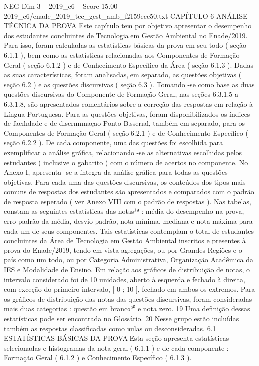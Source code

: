 \begin{textsample}{NEG Dim 3 – 2019\_c6 – Score 15.00 – 2019\_c6/enade\_2019\_tec\_gest\_amb\_f2159ecc50.txt}  \label{ex:f3_neg_266}
CAPÍTULO 6 ANÁLISE TÉCNICA DA PROVA Este capítulo tem por objetivo apresentar o desempenho dos estudantes concluintes de Tecnologia em Gestão Ambiental no Enade/2019.
Para isso, foram calculadas as estatísticas básicas da prova em seu todo ( seção 6.1.1 ), bem como as estatísticas relacionadas aos Componentes de Formação Geral ( seção 6.1.2 ) e de Conhecimento Específico da Área ( seção 6.1.3 ).
Dadas as suas características, foram analisadas, em separado, as questões objetivas ( seção 6.2 ) e as questões discursivas ( seção 6.3 ).
Tomando -se como base as duas questões discursivas do Componente de Formação Geral, nas seções 6.3.1.5 a 6.3.1.8, são apresentados comentários sobre a correção das respostas em relação à Língua Portuguesa.
Para as questões objetivas, foram disponibilizados os índices de facilidade e de discriminação Ponto-Bisserial, também em separado, para os Componentes de Formação Geral ( seção 6.2.1 ) e de Conhecimento Específico ( seção 6.2.2 ).
De cada componente, uma das questões foi escolhida para exemplificar a análise gráfica, relacionando -se as alternativas escolhidas pelos estudantes ( inclusive o gabarito ) com o número de acertos no componente.
No Anexo I, apresenta -se a íntegra da análise gráfica para todas as questões objetivas.
Para cada uma das questões discursivas, os conteúdos dos tipos mais comuns de respostas dos estudantes são apresentados e comparados com o padrão de resposta esperado ( ver Anexo VIII com o padrão de respostas ).
Nas tabelas, constam as seguintes estatísticas das notas¹⁹ : média do desempenho na prova, erro padrão da média, desvio padrão, nota mínima, mediana e nota máxima para cada um de seus componentes.
Tais estatísticas contemplam o total de estudantes concluintes da Área de Tecnologia em Gestão Ambiental inscritos e presentes à prova do Enade/2019, tendo em vista agregações, ou por Grandes Regiões e o país como um todo, ou por Categoria Administrativa, Organização Acadêmica da IES e Modalidade de Ensino.
Em relação aos gráficos de distribuição de notas, o intervalo considerado foi de 10 unidades, aberto à esquerda e fechado à direita, com exceção do primeiro intervalo, [ 0 ; 10 ], fechado em ambos os extremos.
Para os gráficos de distribuição das notas das questões discursivas, foram consideradas mais duas categorias : questão em branco²⁰ e nota zero. 19 Uma definição dessas estatísticas pode ser encontrada no Glossário. 20 Nesse grupo estão incluídas também as respostas classificadas como nulas ou desconsideradas. 6.1 ESTATÍSTICAS BÁSICAS DA PROVA Esta seção apresenta estatísticas selecionadas e histogramas da nota geral ( 6.1.1 ) e de cada componente : Formação Geral ( 6.1.2 ) e Conhecimento Específico ( 6.1.3 ).

\end{textsample}
